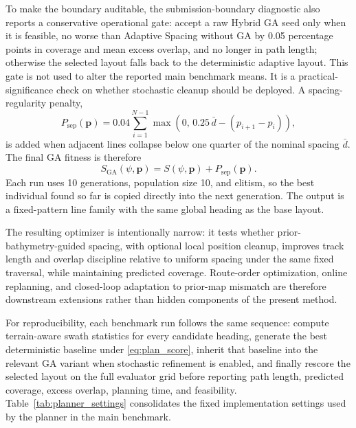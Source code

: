 \documentclass[jmse,article,submit,moreauthors]{Definitions/mdpi}
\begin{document}
To make the boundary auditable, the submission-boundary diagnostic also reports a conservative operational gate: accept a raw Hybrid GA seed only when it is feasible, no worse than Adaptive Spacing without GA by 0.05 percentage points in coverage and mean excess overlap, and no longer in path length; otherwise the selected layout falls back to the deterministic adaptive layout. This gate is not used to alter the reported main benchmark means. It is a practical-significance check on whether stochastic cleanup should be deployed. A spacing-regularity penalty,
\begin{equation}
P_{\mathrm{sep}}(\mathbf{p})
=
0.04\sum_{i=1}^{N-1}\max\!\left(0,\,0.25\,\bar{d}-\left(p_{i+1}-p_i\right)\right),
\end{equation}
is added when adjacent lines collapse below one quarter of the nominal spacing $\bar{d}$. The final GA fitness is therefore
\begin{equation}
S_{\mathrm{GA}}(\psi,\mathbf{p})=S(\psi,\mathbf{p})+P_{\mathrm{sep}}(\mathbf{p}).
\end{equation}
Each run uses 10 generations, population size 10, and elitism, so the best individual found so far is copied directly into the next generation. The output is a fixed-pattern line family with the same global heading as the base layout.

The resulting optimizer is intentionally narrow: it tests whether prior-bathymetry-guided spacing, with optional local position cleanup, improves track length and overlap discipline relative to uniform spacing under the same fixed traversal, while maintaining predicted coverage. Route-order optimization, online replanning, and closed-loop adaptation to prior-map mismatch are therefore downstream extensions rather than hidden components of the present method.

For reproducibility, each benchmark run follows the same sequence: compute terrain-aware swath statistics for every candidate heading, generate the best deterministic baseline under \eqref{eq:plan_score}, inherit that baseline into the relevant GA variant when stochastic refinement is enabled, and finally rescore the selected layout on the full evaluator grid before reporting path length, predicted coverage, excess overlap, planning time, and feasibility. Table~\ref{tab:planner_settings} consolidates the fixed implementation settings used by the planner in the main benchmark.
\end{document}
